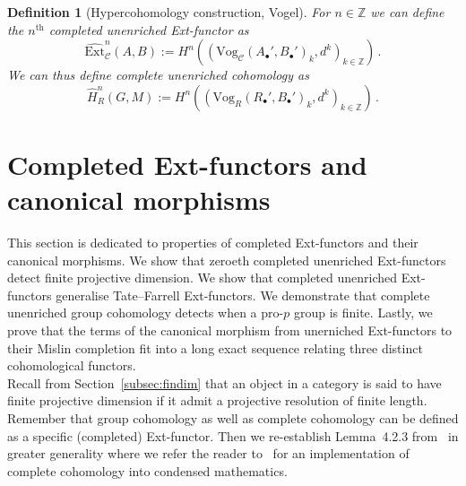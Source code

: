 \documentclass[12pt, a4paper]{article}
\numberwithin{equation}{section}
\newtheorem{defn}[thm]{Definition}
\theoremstyle{empty}
\theoremstyle{nonumberplain}
\begin{document}
\begin{defn}[Hypercohomology construction, Vogel]\label{defn:vogel}
For $n \in \mathbb{Z}$ we can define the $n^{\text{th}}$ completed unenriched Ext-functor as
\[ \widehat{\mathrm{Ext}}_{\mathcal{C}}^n(A, B) := H^n((\mathrm{Vog}_{\mathcal{C}}(A_{\bullet}', B_{\bullet}')_k, d^k)_{k \in \mathbb{Z}}) \, . \]
We can thus define complete unenriched cohomology as
\[ \widehat{H}_R^n(G, M) := H^n((\mathrm{Vog}_R(R_{\bullet}', B_{\bullet}')_k, d^k)_{k \in \mathbb{Z}})\, . \]
\end{defn}

\section{Completed Ext-functors and canonical morphisms}\label{sec:complextandcan}

This section is dedicated to properties of completed Ext-functors and their canonical morphisms. We show that zeroeth completed unenriched Ext-functors detect finite projective dimension. We show that completed unenriched Ext-functors generalise Tate--Farrell Ext-functors. We demonstrate that complete unenriched group cohomology detects when a pro-$p$ group is finite. Lastly, we prove that the terms of the canonical morphism from unerniched Ext-functors to their Mislin completion fit into a long exact sequence relating three distinct cohomological functors. \\

Recall from Section~\ref{subsec:findim} that an object in a category is said to have finite projective dimension if it admit a projective resolution of finite length. Remember that group cohomology as well as complete cohomology can be defined as a specific (completed) Ext-functor. Then we re-establish Lemma~4.2.3 from~\cite{kro95} in greater generality where we refer the reader to~\cite[Section~7]{ghe24} for an implementation of complete cohomology into condensed mathematics.
\end{document}
